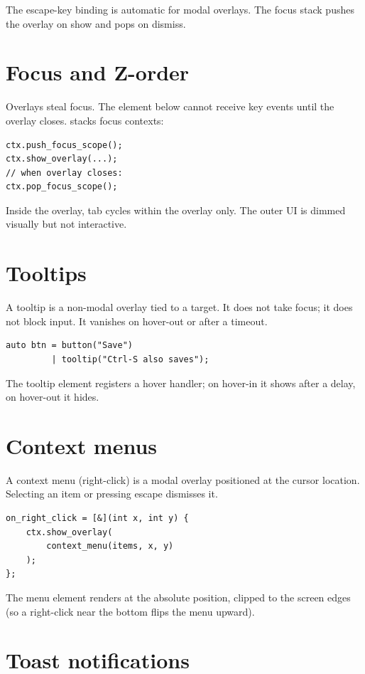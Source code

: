 The escape-key binding is automatic for modal overlays. The
focus stack pushes the overlay on show and pops on dismiss.

\section{Focus and Z-order}

Overlays steal focus. The element below cannot receive key
events until the overlay closes. \maya{} stacks focus contexts:

\begin{lstlisting}
ctx.push_focus_scope();
ctx.show_overlay(...);
// when overlay closes:
ctx.pop_focus_scope();
\end{lstlisting}

Inside the overlay, tab cycles within the overlay only. The
outer UI is dimmed visually but not interactive.

\section{Tooltips}

A tooltip is a non-modal overlay tied to a target. It does not
take focus; it does not block input. It vanishes on hover-out
or after a timeout.

\begin{lstlisting}
auto btn = button("Save")
         | tooltip("Ctrl-S also saves");
\end{lstlisting}

The tooltip element registers a hover handler; on hover-in it
shows after a delay, on hover-out it hides.

\section{Context menus}

A context menu (right-click) is a modal overlay positioned at
the cursor location. Selecting an item or pressing escape
dismisses it.

\begin{lstlisting}
on_right_click = [&](int x, int y) {
    ctx.show_overlay(
        context_menu(items, x, y)
    );
};
\end{lstlisting}

The menu element renders at the absolute position, clipped to
the screen edges (so a right-click near the bottom flips the
menu upward).

\section{Toast notifications}

